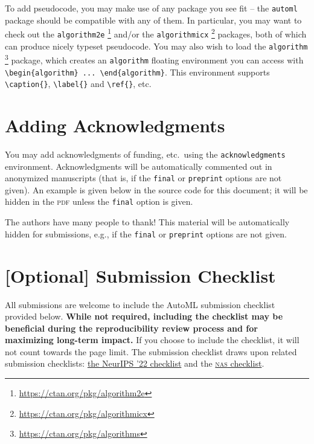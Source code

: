 \documentclass[11pt]{article}
\begin{document}
To add pseudocode, you may make use of any package you see fit -- the
\texttt{automl} package should be compatible with any of them. In particular,
you may want to check out the \texttt{algorithm2e}%
%
\footnote{\url{https://ctan.org/pkg/algorithm2e}}
%
and/or the \texttt{algorithmicx}%
%
\footnote{\url{https://ctan.org/pkg/algorithmicx}}
%
packages, both of which can produce nicely typeset pseudocode. You may also wish
to load the \texttt{algorithm}%
%
\footnote{\url{https://ctan.org/pkg/algorithms}}
%
package, which creates an \texttt{algorithm} floating environment you can access
with \verb|\begin{algorithm} ... \end{algorithm}|. This environment supports
\verb|\caption{}|, \verb|\label{}| and \verb|\ref{}|, etc.

\section{Adding Acknowledgments}

You may add acknowledgments of funding, etc.\ using the \texttt{acknowledgments}
environment. Acknowledgments will be automatically commented out in anonymized
manuscripts (that is, if the \texttt{final} or \texttt{preprint} options are not
given). An example is given below in the source code for this document; it will
be hidden in the \textsc{pdf} unless the \texttt{final} option is given.

\begin{acknowledgements}
   The authors have many people to thank! This material will be automatically
   hidden for submissions, e.g., if the \texttt{final} or \texttt{preprint}
   options are not given.
 \end{acknowledgements}



\newpage
\section{[Optional] Submission Checklist}
All submissions are welcome to include the AutoML submission checklist provided
below. \textbf{While not required, including the checklist may be beneficial
  during the reproducibility review process and for maximizing long-term
  impact.} If you choose to include the checklist, it will not count towards the
page limit. The submission checklist draws upon related submission checklists:
%
\href{https://neurips.cc/Conferences/2022/PaperInformation/PaperChecklist}
     {the NeurIPS '22 checklist}
%
and the
\href{https://www.automl.org/wp-content/uploads/NAS/NAS_checklist.pdf}
     {\textsc{nas} checklist}.
%
\end{document}
